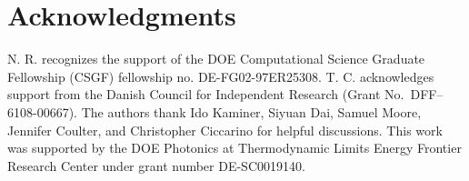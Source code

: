 \documentclass[aps,prb,twocolumn,
	           groupedaddress,superscriptaddress,
               amsfonts,amssymb,amsmath,floatfix,
	           citeautoscript]{revtex4-1}
\begin{document}
\section{Acknowledgments}
N. R. recognizes the support of the DOE Computational Science Graduate Fellowship (CSGF) fellowship no. DE-FG02-97ER25308. T. C. acknowledges support from the Danish Council for Independent Research (Grant No.\ DFF--6108-00667). The authors thank Ido Kaminer, Siyuan Dai, Samuel Moore, Jennifer Coulter, and Christopher Ciccarino for helpful discussions. This work was supported by the DOE Photonics at Thermodynamic Limits Energy Frontier Research Center under grant number DE-SC0019140.





\end{document}
